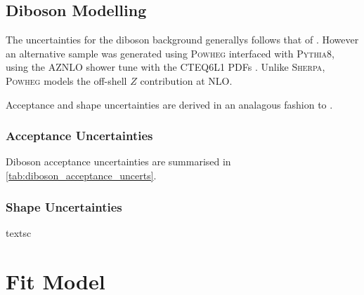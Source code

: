 \subsection{Diboson Modelling}

The uncertainties for the diboson background generallys follows that of \Vjets.
However an alternative sample was generated using \textsc{Powheg} interfaced with \textsc{Pythia8}, using the AZNLO shower tune with the CTEQ6L1 PDFs \cite{Pumplin:2002:CTEQ6L1}.
Unlike \textsc{Sherpa}, \textsc{Powheg} models the off-shell $Z$ contribution at NLO.

Acceptance and shape uncertainties are derived in an analagous fashion to \Vjets.

\subsubsection{Acceptance Uncertainties}

Diboson acceptance uncertainties are summarised in \cref{tab:diboson_acceptance_uncerts}.



\subsubsection{Shape Uncertainties}

textsc


\section{Fit Model}\label{sec:vhbb_fit}

